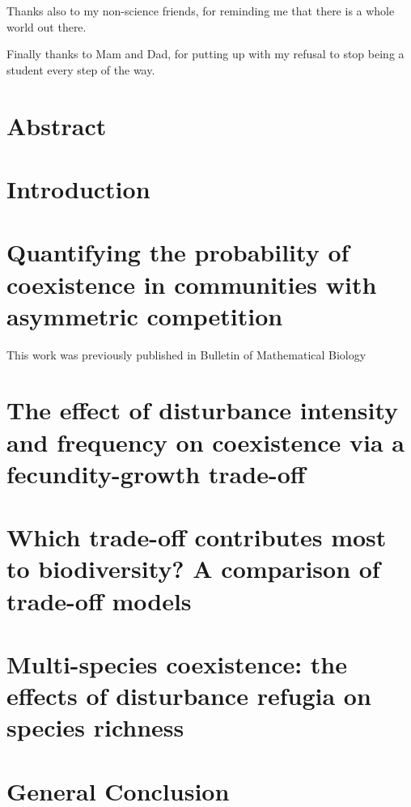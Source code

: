 \documentclass[a4paper]{report}
\begin{document}
Thanks also to my non-science friends, for reminding me that there is a whole world out there.

Finally thanks to Mam and Dad, for putting up with my refusal to stop being a student every step of the way. 

\chapter*{Abstract}


\tableofcontents
\listoffigures
\listoftables


    \newpage
    \setcounter{chapter}{-1}
\chapter{Introduction}


\newpage
\chapter{Quantifying the probability of coexistence in communities with asymmetric competition}
This work was previously published in Bulletin of Mathematical Biology \citep{nattrass2012quantifying}


\newpage
\chapter{The effect of disturbance intensity and frequency on coexistence via a fecundity-growth trade-off}


\newpage
\chapter{Which trade-off contributes most to biodiversity? A comparison of trade-off models}


\newpage
\chapter{Multi-species coexistence: the effects of disturbance refugia on species richness}



\newpage
\chapter{General Conclusion}


   \newpage



\pagebreak
\end{document}
